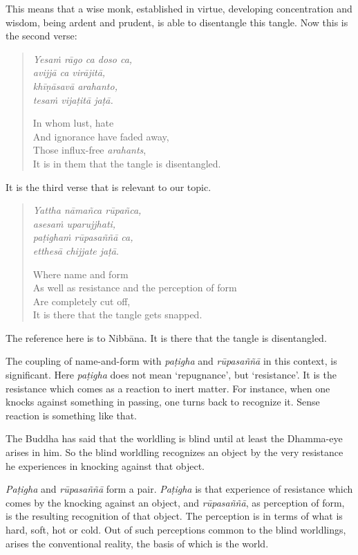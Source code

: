 This means that a wise monk, established in virtue, developing concentration and wisdom, being ardent and prudent, is able to disentangle this tangle. Now this is the second verse:

\clearpage

\begin{quote}
\emph{Yesaṁ rāgo ca doso ca,}\\
\emph{avijjā ca virājitā,}\\
\emph{khīṇāsavā arahanto,}\\
\emph{tesaṁ vijaṭitā jaṭā.}

In whom lust, hate\\
And ignorance have faded away,\\
Those influx-free \emph{arahants},\\
It is in them that the tangle is disentangled.
\end{quote}

It is the third verse that is relevant to our topic.

\begin{quote}
\emph{Yattha nāmañca rūpañca,}\\
\emph{asesaṁ uparujjhati,}\\
\emph{paṭighaṁ rūpasaññā ca,}\\
\emph{etthesā chijjate jaṭā}.

Where name and form\\
As well as resistance and the perception of form\\
Are completely cut off,\\
It is there that the tangle gets snapped.
\end{quote}

The reference here is to Nibbāna. It is there that the tangle is disentangled.

The coupling of name-and-form with \emph{paṭigha} and \emph{rūpasaññā} in this context, is significant. Here \emph{paṭigha} does not mean `repugnance', but `resistance'. It is the resistance which comes as a reaction to inert matter. For instance, when one knocks against something in passing, one turns back to recognize it. Sense reaction is something like that.

The Buddha has said that the worldling is blind until at least the Dhamma-eye arises in him. So the blind worldling recognizes an object by the very resistance he experiences in knocking against that object.

\emph{Paṭigha} and \emph{rūpasaññā} form a pair. \emph{Paṭigha} is that experience of resistance which comes by the knocking against an object, and \emph{rūpasaññā}, as perception of form, is the resulting recognition of that object. The perception is in terms of what is hard, soft, hot or cold. Out of such perceptions common to the blind worldlings, arises the conventional reality, the basis of which is the world.

